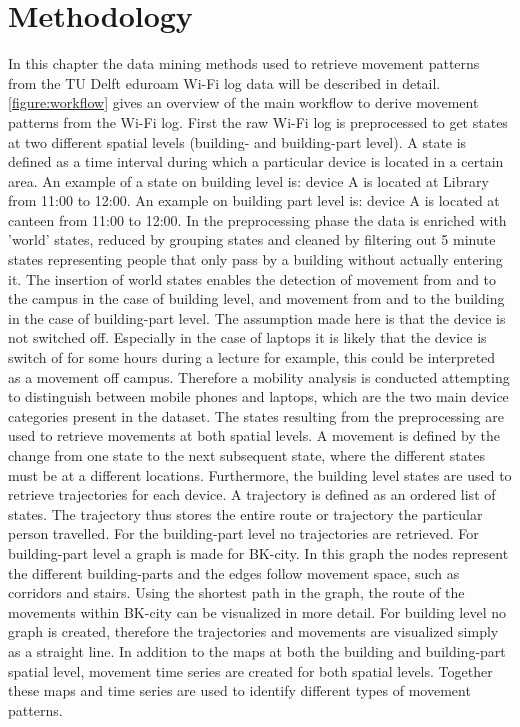 \chapter{Methodology}\label{Methodology}
In this chapter the data mining methods used to retrieve movement patterns from the TU Delft eduroam Wi-Fi log data will be described in detail. \autoref{figure:workflow} gives an overview of the main workflow to derive movement patterns from the Wi-Fi log. First the raw Wi-Fi log is preprocessed to get states at two different spatial levels (building- and building-part level). A state is defined as a time interval during which a particular device is located in a certain area. An example of a state on building level is: device A is located at Library from 11:00 to 12:00. An example on building part level is: device A is located at canteen from 11:00 to 12:00. In the preprocessing phase the data is enriched with 'world' states, reduced by grouping states and cleaned by filtering out 5 minute states representing people that only pass by a building without actually entering it. The insertion of world states enables the detection of movement from and to the campus in the case of building level, and movement from and to the building in the case of building-part level. The assumption made here is that the device is not switched off. Especially in the case of laptops it is likely that the device is switch of for some hours during a lecture for example, this could be interpreted as a movement off campus. Therefore a mobility analysis is conducted attempting to distinguish between mobile phones and laptops, which are the two main device categories present in the dataset. The states resulting from the preprocessing are used to retrieve movements at both spatial levels. A movement is defined by the change from one state to the next subsequent state, where the different states must be at a different locations. Furthermore, the building level states are used to retrieve trajectories for each device. A trajectory is defined as an ordered list of states. The trajectory thus stores the entire route or trajectory the particular person travelled. For the building-part level no trajectories are retrieved. For building-part level a graph is made for BK-city. In this graph the nodes represent the different building-parts and the edges follow movement space, such as corridors and stairs. Using the shortest path in the graph, the route of the movements within BK-city can be visualized in more detail. For building level no graph is created, therefore the trajectories and movements are visualized simply as a straight line. In addition to the maps at both the building and building-part spatial level, movement time series are created for both spatial levels. Together these maps and time series are used to identify different types of movement patterns.

